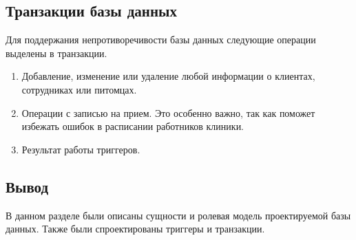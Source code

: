 \subsection{Транзакции базы данных}
Для поддержания непротиворечивости базы данных следующие операции выделены в транзакции.

\begin{enumerate}[label=\arabic*)]
	\item Добавление, изменение или удаление любой информации о клиентах, сотрудниках или питомцах. 
	\item Операции с записью на прием. Это особенно важно, так как поможет избежать ошибок в расписании работников клиники.
	\item Результат работы триггеров. 
\end{enumerate}


\subsection*{Вывод}
В данном разделе были описаны сущности и ролевая модель проектируемой базы данных. Также были спроектированы триггеры и транзакции.